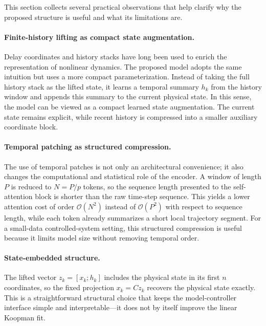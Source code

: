 \documentclass[journal]{IEEEtran}
\begin{document}
This section collects several practical observations that help clarify why the proposed structure is useful and what its limitations are.

\paragraph{Finite-history lifting as compact state augmentation.}
Delay coordinates and history stacks have long been used to enrich the representation of nonlinear dynamics. The proposed model adopts the same intuition but uses a more compact parameterization. Instead of taking the full history stack as the lifted state, it learns a temporal summary $h_k$ from the history window and appends this summary to the current physical state. In this sense, the model can be viewed as a compact learned state augmentation. The current state remains explicit, while recent history is compressed into a smaller auxiliary coordinate block.

\paragraph{Temporal patching as structured compression.}
The use of temporal patches is not only an architectural convenience; it also changes the computational and statistical role of the encoder. A window of length $P$ is reduced to $N=P/p$ tokens, so the sequence length presented to the self-attention block is shorter than the raw time-step sequence. This yields a lower attention cost of order $\mathcal{O}(N^2)$ instead of $\mathcal{O}(P^2)$ with respect to sequence length, while each token already summarizes a short local trajectory segment. For a small-data controlled-system setting, this structured compression is useful because it limits model size without removing temporal order.

\paragraph{State-embedded structure.}
The lifted vector $z_k=[x_k;h_k]$ includes the physical state in its first $n$ coordinates, so the fixed projection $x_k=Cz_k$ recovers the physical state exactly. This is a straightforward structural choice that keeps the model-controller interface simple and interpretable—it does not by itself improve the linear Koopman fit.
\end{document}
